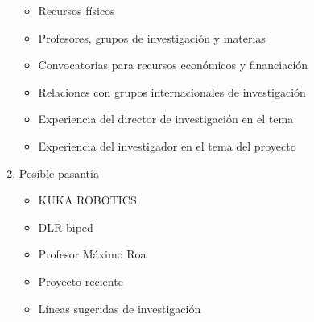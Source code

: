 \begin{frame}[label=motivacion]
\begin{columns}[T,totalwidth=0.97\textwidth]
\begin{column}{0.55\textwidth}
\begin{enumerate}
{\begin{itemize}
          \item<21-|alert@21|uncover@21-22> Recursos f\'isicos
          \item<23-|alert@23|uncover@23-24> Profesores, grupos de investigaci\'on y materias
          \item<25-|alert@25|uncover@25-26> Convocatorias para recursos econ\'omicos y financiaci\'on
          \item<27-|alert@27|uncover@27-28> Relaciones con grupos internacionales de investigaci\'on
          \item<29-|alert@29|uncover@29-30> Experiencia del director de investigaci\'on en el tema
          \item<31-|alert@31|uncover@31-32> Experiencia del investigador en el tema del proyecto
          \end{itemize}
        }
      \item<33-|alert@33|uncover@33-38> Posible pasant\'ia
        \begin{itemize}\scriptsize
        \item<34-|alert@34|uncover@34> KUKA ROBOTICS
        \item<35-|alert@35|uncover@35> DLR-biped
        \item<36-|alert@36|uncover@36> Profesor M\'aximo Roa
        \item<37-|alert@37|uncover@37> Proyecto reciente
        \item<38-|alert@38|uncover@38> L\'ineas sugeridas de investigaci\'on
        \end{itemize}
      \end{enumerate}
    \end{column}
    \begin{column}{0.4\textwidth}
      \parbox[c][7cm][c]{4.0cm}{
        }
\end{column}
\end{columns}
\end{frame}
